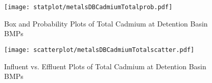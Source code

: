         \begin{figure}[hb]   %
            \centering
            \texttt{[image: statplot/metalsDBCadmiumTotalprob.pdf]}
            \caption{Box and Probability Plots of Total Cadmium at Detention Basin BMPs}
        \end{figure}         %
        
        
        \begin{figure}[hb]   %
            \centering
            \texttt{[image: scatterplot/metalsDBCadmiumTotalscatter.pdf]}
            \caption{Influent vs. Effluent Plots of Total Cadmium at Detention Basin BMPs}
        \end{figure}         %
        \clearpage
        